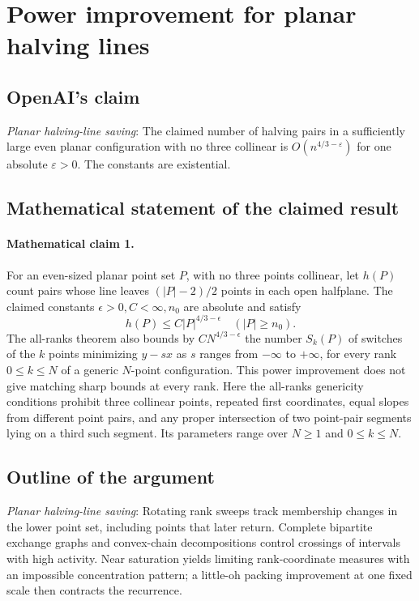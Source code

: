 \documentclass[11pt]{article}
\begin{document}
\section*{Power improvement for planar halving lines}

\subsection{OpenAI's claim}
\textit{Planar halving-line saving}: The claimed number of halving pairs in a sufficiently large even planar configuration with no three collinear is $O(n^{4/3-\varepsilon})$ for one absolute $\varepsilon>0$. The constants are existential.

\subsection{Mathematical statement of the claimed result}
\paragraph{Mathematical claim 1.} For an even-sized planar point set $P$, with no three points collinear, let $h(P)$ count pairs whose line leaves $(|P|-2)/2$ points in each open halfplane. The claimed constants $\epsilon>0,C<\infty,n_0$ are absolute and satisfy \[h(P)\le C|P|^{4/3-\epsilon}\quad(|P|\ge n_0).\] The all-ranks theorem also bounds by $CN^{4/3-\epsilon}$ the number $S_k(P)$ of switches of the $k$ points minimizing $y-sx$ as $s$ ranges from $-\infty$ to $+\infty$, for every rank $0\le k\le N$ of a generic $N$-point configuration. This power improvement does not give matching sharp bounds at every rank. Here the all-ranks genericity conditions prohibit three collinear points, repeated first coordinates, equal slopes from different point pairs, and any proper intersection of two point-pair segments lying on a third such segment. Its parameters range over $N\ge1$ and $0\le k\le N$.

\subsection{Outline of the argument}
\textit{Planar halving-line saving}: Rotating rank sweeps track membership changes in the lower point set, including points that later return. Complete bipartite exchange graphs and convex-chain decompositions control crossings of intervals with high activity. Near saturation yields limiting rank-coordinate measures with an impossible concentration pattern; a little-oh packing improvement at one fixed scale then contracts the recurrence.
\end{document}
